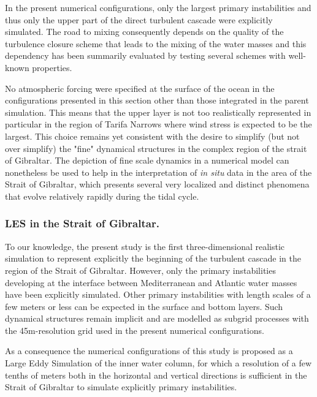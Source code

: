In the present numerical configurations, only the largest primary instabilities and thus only the upper part of the direct turbulent cascade were explicitly simulated. The road to mixing consequently depends on the quality of the turbulence closure scheme that leads to the mixing of the water masses and this dependency has been summarily evaluated by testing several schemes with well-known properties. 

No atmospheric forcing were specified at the surface of the ocean in the configurations presented in this section other than those integrated in the parent simulation. This means that the upper layer is not too realistically represented in particular in the region of Tarifa Narrows where wind stress is expected to be the largest. This choice remains yet consistent with the desire to simplify (but not over simplify) the "fine" dynamical structures in the complex region of the strait of Gibraltar. %
The depiction of fine scale dynamics in a numerical model can nonetheless be used to help in the interpretation of \textit{in situ} data in the area of the Strait of Gibraltar, which presents several very localized and distinct phenomena that evolve relatively rapidly during the tidal cycle.

\subsubsection{LES in the Strait of Gibraltar.}
To our knowledge, the present study is the first three-dimensional realistic simulation to represent explicitly the beginning of the turbulent cascade in the region of the Strait of Gibraltar. However, only the primary instabilities developing at the interface between Mediterranean and Atlantic water masses have been explicitly simulated. Other primary instabilities  with length scales of a few meters or less can be expected in the surface and bottom layers. Such dynamical structures remain implicit and are modelled as subgrid processes with the 45m-resolution grid used in the present numerical configurations.

As a consequence the numerical configurations of this study is proposed as a Large Eddy Simulation of the inner water column, for which a resolution of a few tenths of meters both in the horizontal and vertical directions is sufficient in the Strait of Gibraltar to simulate explicitly primary instabilities.

